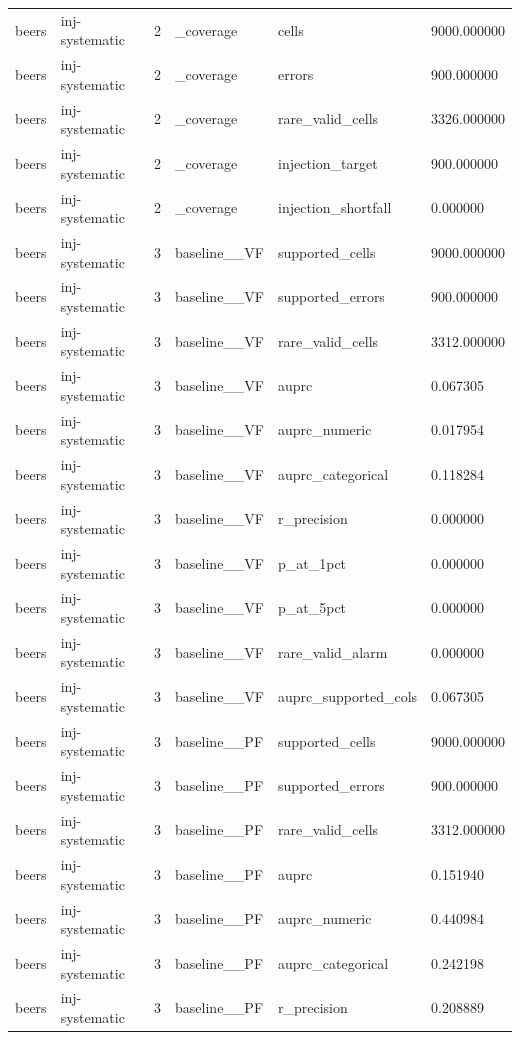 \begin{tabular}{llllll}
beers & inj-systematic & 2 & \_coverage & cells & 9000.000000 \\
beers & inj-systematic & 2 & \_coverage & errors & 900.000000 \\
beers & inj-systematic & 2 & \_coverage & rare\_valid\_cells & 3326.000000 \\
beers & inj-systematic & 2 & \_coverage & injection\_target & 900.000000 \\
beers & inj-systematic & 2 & \_coverage & injection\_shortfall & 0.000000 \\
beers & inj-systematic & 3 & baseline\_\_VF & supported\_cells & 9000.000000 \\
beers & inj-systematic & 3 & baseline\_\_VF & supported\_errors & 900.000000 \\
beers & inj-systematic & 3 & baseline\_\_VF & rare\_valid\_cells & 3312.000000 \\
beers & inj-systematic & 3 & baseline\_\_VF & auprc & 0.067305 \\
beers & inj-systematic & 3 & baseline\_\_VF & auprc\_numeric & 0.017954 \\
beers & inj-systematic & 3 & baseline\_\_VF & auprc\_categorical & 0.118284 \\
beers & inj-systematic & 3 & baseline\_\_VF & r\_precision & 0.000000 \\
beers & inj-systematic & 3 & baseline\_\_VF & p\_at\_1pct & 0.000000 \\
beers & inj-systematic & 3 & baseline\_\_VF & p\_at\_5pct & 0.000000 \\
beers & inj-systematic & 3 & baseline\_\_VF & rare\_valid\_alarm & 0.000000 \\
beers & inj-systematic & 3 & baseline\_\_VF & auprc\_supported\_cols & 0.067305 \\
beers & inj-systematic & 3 & baseline\_\_PF & supported\_cells & 9000.000000 \\
beers & inj-systematic & 3 & baseline\_\_PF & supported\_errors & 900.000000 \\
beers & inj-systematic & 3 & baseline\_\_PF & rare\_valid\_cells & 3312.000000 \\
beers & inj-systematic & 3 & baseline\_\_PF & auprc & 0.151940 \\
beers & inj-systematic & 3 & baseline\_\_PF & auprc\_numeric & 0.440984 \\
beers & inj-systematic & 3 & baseline\_\_PF & auprc\_categorical & 0.242198 \\
beers & inj-systematic & 3 & baseline\_\_PF & r\_precision & 0.208889 \\

\end{tabular}

